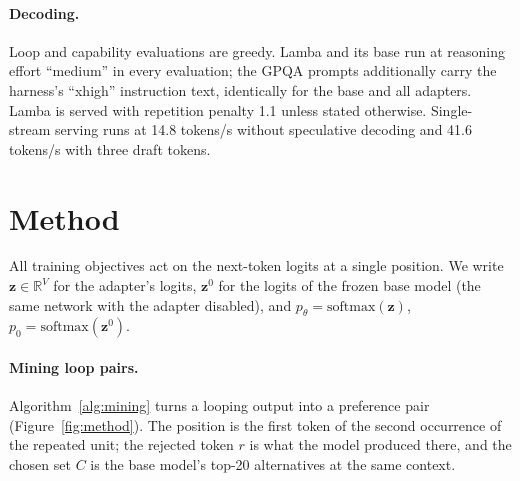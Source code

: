 \documentclass[11pt]{article}
\begin{document}
\paragraph{Decoding.} Loop and capability evaluations are greedy. Lamba and its base run at reasoning effort ``medium'' in every evaluation; the GPQA prompts additionally carry the harness's ``xhigh'' instruction text, identically for the base and all adapters. Lamba is served with repetition penalty 1.1 unless stated otherwise. Single-stream serving runs at 14.8 tokens/s without speculative decoding and 41.6 tokens/s with three draft tokens.

\section{Method}
\label{sec:method}

All training objectives act on the next-token logits at a single position. We write $\bm{z}\in\mathbb{R}^{V}$ for the adapter's logits, $\bm{z}^{0}$ for the logits of the frozen base model (the same network with the adapter disabled), and $p_\theta = \mathrm{softmax}(\bm{z})$, $p_0 = \mathrm{softmax}(\bm{z}^{0})$.

\paragraph{Mining loop pairs.} Algorithm~\ref{alg:mining} turns a looping output into a preference pair (Figure~\ref{fig:method}). The position is the first token of the second occurrence of the repeated unit; the rejected token $r$ is what the model produced there, and the chosen set $C$ is the base model's top-20 alternatives at the same context.
\end{document}
